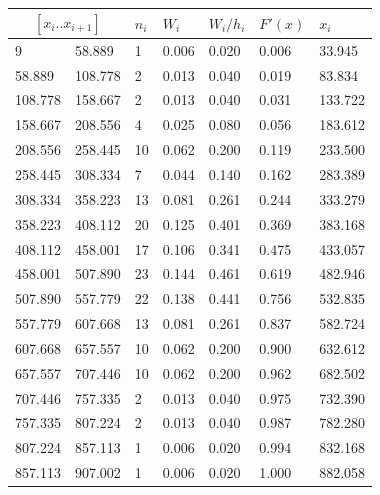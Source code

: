 \begin{table}[h]
    \begin{center}
        \begin{tabular}{|l|l|l|l|l|l|l|}
            \hline
            \multicolumn{2}{|c|}{$[x_{i}..x_{i+1}]$} & $n_{i}$ & $W_{i}$ & $W_{i}/h_{i}$ & $F{}'(x)$
            & $x_{i}$
            \\
            \hline
            9       & 58.889  & 1  & 0.006 & 0.020 & 0.006 & 33.945  \\
            \hline
            58.889  & 108.778 & 2  & 0.013 & 0.040 & 0.019 & 83.834  \\
            \hline
            108.778 & 158.667 & 2  & 0.013 & 0.040 & 0.031 & 133.722 \\
            \hline
            158.667 & 208.556 & 4  & 0.025 & 0.080 & 0.056 & 183.612 \\
            \hline
            208.556 & 258.445 & 10 & 0.062 & 0.200 & 0.119 & 233.500 \\
            \hline
            258.445 & 308.334 & 7  & 0.044 & 0.140 & 0.162 & 283.389 \\
            \hline
            308.334 & 358.223 & 13 & 0.081 & 0.261 & 0.244 & 333.279 \\
            \hline
            358.223 & 408.112 & 20 & 0.125 & 0.401 & 0.369 & 383.168 \\
            \hline
            408.112 & 458.001 & 17 & 0.106 & 0.341 & 0.475 & 433.057 \\
            \hline
            458.001 & 507.890 & 23 & 0.144 & 0.461 & 0.619 & 482.946 \\
            \hline
            507.890 & 557.779 & 22 & 0.138 & 0.441 & 0.756 & 532.835 \\
            \hline
            557.779 & 607.668 & 13 & 0.081 & 0.261 & 0.837 & 582.724 \\
            \hline
            607.668 & 657.557 & 10 & 0.062 & 0.200 & 0.900 & 632.612 \\
            \hline
            657.557 & 707.446 & 10 & 0.062 & 0.200 & 0.962 & 682.502 \\
            \hline
            707.446 & 757.335 & 2  & 0.013 & 0.040 & 0.975 & 732.390 \\
            \hline
            757.335 & 807.224 & 2  & 0.013 & 0.040 & 0.987 & 782.280 \\
            \hline
            807.224 & 857.113 & 1  & 0.006 & 0.020 & 0.994 & 832.168 \\
            \hline
            857.113 & 907.002 & 1  & 0.006 & 0.020 & 1.000 & 882.058 \\
            \hline
        \end{tabular}
    \end{center}
\end{table}

